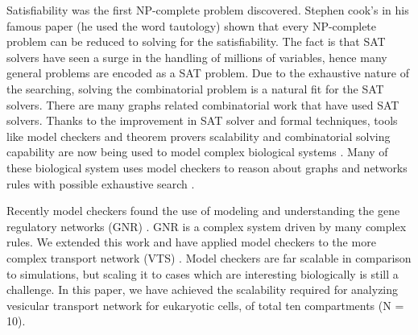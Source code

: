 Satisfiability was the first NP-complete problem discovered. Stephen cook's in his famous paper \cite{cook1971complexity} (he used the word tautology) shown that every NP-complete problem can be reduced to solving for the satisfiability. The fact is that SAT solvers have seen a surge in the handling of millions of variables, hence many general problems are encoded as a SAT problem. Due to the exhaustive nature of the searching, solving the combinatorial problem is a natural fit for the SAT solvers. There are many graphs related combinatorial work \cite{gay2013solving,wotzlaw2012generalized} that have used SAT solvers. Thanks to the improvement in SAT solver and formal techniques, tools like model checkers and theorem provers scalability and combinatorial solving capability are now being used to model complex biological systems \cite{heule2010exact,yordanov2013smt,mangla2010timing}.
Many of these biological system uses model checkers to reason about graphs and networks rules with possible exhaustive search \cite{guerra2012reasoning,chin2008biographe}.  

Recently model checkers found the use of modeling and understanding the gene regulatory networks (GNR) \cite{giacobbe2015model,rosenblueth2014inference, batt2010efficient}. GNR is a complex system driven by many complex rules. We extended this work and have applied model checkers to the more complex transport network (VTS) \cite{mani2016stacking}. Model checkers are far scalable in comparison to simulations, but scaling it to cases which are interesting biologically is still a challenge. In this paper, we have achieved the scalability required for analyzing vesicular transport network for eukaryotic cells, of total ten compartments (N = 10). \\


